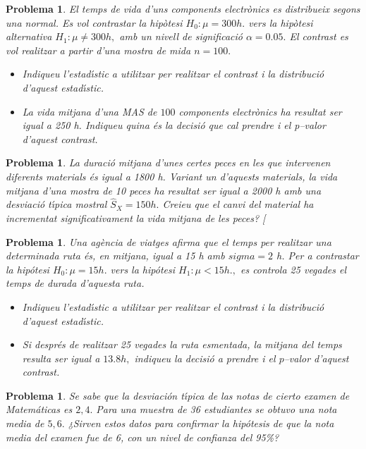 \documentclass[11pt]{article}
\newcounter{prbcont}
\newtheorem{problema}[prbcont]{Problema}
\begin{document}
\begin{problema}
El temps de vida d'uns components electr\`onics es distribueix segons una normal.
Es vol contrastar la hip\`otesi $H_0 : \mu = 300 h.$ vers la hip\`otesi alternativa
$H_1 : \mu \neq 300 h,$ amb un nivell de significaci\'o $\alpha = 0.05.$ El contrast es vol realitzar a partir d'una mostra de mida $n = 100.$
\begin{itemize}
\item [(a)] Indiqueu l'estad\'{\i}stic a utilitzar per realitzar el contrast i la distribuci\'o d'aquest estad\'{\i}stic.
\item [(b)] La vida mitjana d'una MAS de $100$ components electr\`onics ha resultat ser igual
a 250 h. Indiqueu quina \'es la decisi\'o que cal prendre i el p--valor d'aquest
contrast. %
\end{itemize}
\end{problema}

\begin{problema}
La duraci\'o mitjana d'unes certes peces en les que intervenen diferents materials \'es
igual a 1800 h. Variant un d'aquests materials, la vida mitjana d'una mostra de 10
peces ha resultat ser igual a 2000 h amb una desviaci\'o t\'{\i}pica mostral $\hat{S}_X = 150 h.$
Creieu que el canvi del material ha incrementat significativament la vida mitjana de
les peces? [%
\end{problema}

\begin{problema}
Una ag\`encia de viatges afirma que el temps per realitzar una determinada ruta \'es, en
mitjana, igual a 15 h amb $sigma = 2$ h. Per a contrastar la hip\'otesi $H_0 : \mu = 15 h.$ vers
la hip\'otesi $H_1 : \mu < 15 h.,$ es controla 25 vegades el temps de durada d'aquesta ruta.
\begin{itemize}
\item [(a)] Indiqueu l'estad\'{\i}stic a utilitzar per realitzar el contrast i la distribuci\'o d'aquest estad\'{\i}stic.
\item [(b)] Si despr\'es de realitzar 25 vegades la ruta esmentada, la mitjana del temps resulta
ser igual a $13.8 h,$ indiqueu la decisi\'o a prendre i el $p$--valor d'aquest contrast.
\end{itemize}
\end{problema}

\begin{problema}
Se sabe que la desviaci\'on t\'{\i}pica de las notas de cierto examen de Matem\'aticas es $2,4.$ Para una muestra de 36 estudiantes se obtuvo una nota media de $5,6.$ ¿Sirven estos datos para confirmar la hip\'otesis de que la nota media del examen fue de 6, con un nivel de confianza del 95\%?
\end{problema}
\end{document}
